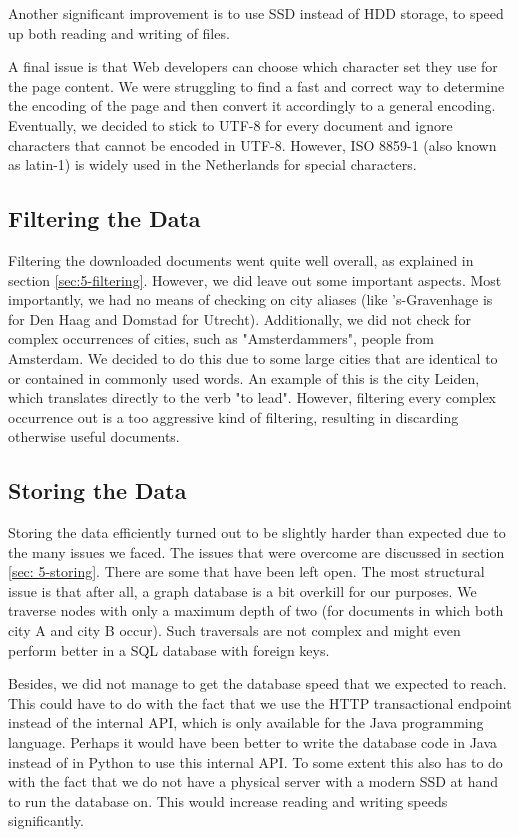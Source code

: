 Another significant improvement is to use SSD instead of HDD storage, to speed up both reading and writing of files.

A final issue is that Web developers can choose which character set they use for the page content. We were struggling to find a fast and correct way to determine the encoding of the page and then convert it accordingly to a general encoding. Eventually, we decided to stick to UTF-8 for every document and ignore characters that cannot be encoded in UTF-8. However, ISO 8859-1 (also known as latin-1) is widely used in the Netherlands for special characters.

\subsection{Filtering the Data}
Filtering the downloaded documents went quite well overall, as explained in section \ref{sec:5-filtering}. However, we did leave out some important aspects. Most importantly, we had no means of checking on city aliases (like 's-Gravenhage is for Den Haag and Domstad for Utrecht). Additionally, we did not check for complex occurrences of cities, such as "Amsterdammers", people from Amsterdam.  We decided to do this due to some large cities that are identical to or contained in commonly used words. An example of this is the city Leiden, which translates directly to the verb "to lead". However, filtering every complex occurrence out is a too aggressive kind of filtering, resulting in discarding otherwise useful documents.

\subsection{Storing the Data}
Storing the data efficiently turned out to be slightly harder than expected due to the many issues we faced. The issues that were overcome are discussed in section \ref{sec: 5-storing}. There are some that have been left open. The most structural issue is that after all, a graph database is a bit overkill for our purposes. We traverse nodes with only a maximum depth of two (for documents in which both city A and city B occur). Such traversals are not complex and might even perform better in a SQL database with foreign keys.

Besides, we did not manage to get the database speed that we expected to reach. This could have to do with the fact that we use the HTTP transactional endpoint instead of the internal API, which is only available for the Java programming language. Perhaps it would have been better to write the database code in Java instead of in Python to use this internal API. To some extent this also has to do with the fact that we do not have a physical server with a modern SSD at hand to run the database on. This would increase reading and writing speeds significantly.

